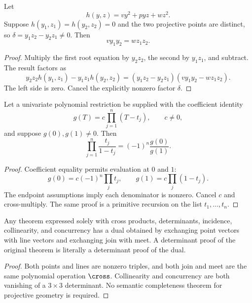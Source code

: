 \begin{lemma}
Let
\[
h(y,z)=v y^2+p yz+wz^2.
\]
Suppose $h(y_1,z_1)=h(y_2,z_2)=0$ and the two projective points are distinct, so
$\delta=y_1z_2-y_2z_1\ne0$.  Then
\[
v y_1y_2=wz_1z_2.
\]
\end{lemma}

\begin{proof}
Multiply the first root equation by $y_2z_2$, the second by $y_1z_1$, and subtract.  The result factors as
\[
y_2z_2h(y_1,z_1)-y_1z_1h(y_2,z_2)
=(y_1z_2-y_2z_1)(v y_1y_2-wz_1z_2).
\]
The left side is zero.  Cancel the explicitly nonzero factor $\delta$.
\end{proof}

\begin{lemma}
Let a univariate polynomial restriction be supplied with the coefficient identity
\[
g(T)=c\prod_{j=1}^{n}(T-t_j),\qquad c\ne0,
\]
and suppose $g(0),g(1)\ne0$.  Then
\[
\prod_{j=1}^{n}\frac{t_j}{1-t_j}
=(-1)^n\frac{g(0)}{g(1)}.
\]
\end{lemma}

\begin{proof}
Coefficient equality permits evaluation at $0$ and $1$:
\[
g(0)=c(-1)^n\prod_jt_j,
\qquad
g(1)=c\prod_j(1-t_j).
\]
The endpoint assumptions imply each denominator is nonzero.  Cancel $c$ and cross-multiply.  The same proof is a primitive recursion on the list $t_1,\ldots,t_n$.
\end{proof}

\begin{lemma}
Any theorem expressed solely with cross products, determinants, incidence, collinearity, and concurrency has a dual obtained by exchanging point vectors with line vectors and exchanging join with meet.  A determinant proof of the original theorem is literally a determinant proof of the dual.
\end{lemma}

\begin{proof}
Both points and lines are nonzero triples, and both join and meet are the same polynomial operation $\cross$.  Collinearity and concurrency are both vanishing of a $3\times3$ determinant.  No semantic completeness theorem for projective geometry is required.
\end{proof}
